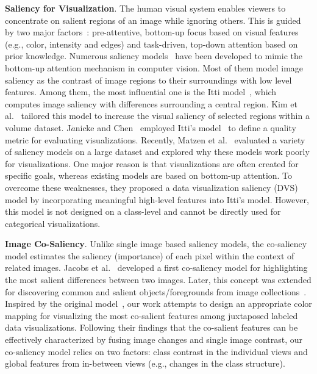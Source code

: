 \vspace{1.5mm}
\noindent\textbf{Saliency for Visualization}.
The human visual system enables viewers to concentrate on salient regions of an image while ignoring others. This is guided by two major factors~\cite{connor2004visual}: pre-attentive, bottom-up focus based on visual features (e.g., color, intensity and edges) and task-driven, top-down attention based on prior knowledge. %
Numerous saliency models~\cite{borji2019salient} have been developed to mimic the bottom-up attention mechanism in computer vision.
Most of them model image saliency as the contrast of image regions to their surroundings with low level features. Among them, the most influential one is the Itti model~\cite{Itti98}, which computes image saliency with
differences surrounding a central region.
Kim et al.~\cite{Kim06} tailored this model to increase the visual saliency of selected regions within a volume dataset.
J$\ddot{a}$nicke and Chen~\cite{Janicke10} employed Itti's model~\cite{Itti98} to define a quality metric for evaluating visualizations.
Recently, Matzen et al.~\cite{Matzen18} evaluated a variety of saliency models on a large dataset and explored why these models work poorly for visualizations. One major reason is that visualizations are often created for specific goals, whereas existing models are based on  bottom-up attention. To overcome these weaknesses, they proposed a data visualization saliency (DVS) model by incorporating meaningful high-level features into Itti's model. However, this model is not designed on a class-level and cannot be directly used for categorical visualizations.

\vspace{1.5mm}
\noindent\textbf{Image Co-Saliency}.
Unlike single image based saliency models, the co-saliency model estimates the saliency (importance) of each pixel within the context of related images. Jacobs et al.~\cite{Jacobs10} developed a first co-saliency model for highlighting the most salient differences between two  images.  Later, this concept was extended for discovering common and salient objects/foregrounds from image collections~\cite{zhang2018review}. Inspired by the original model~\cite{Jacobs10}, our work attempts to design an appropriate color mapping for visualizing the most co-salient features among juxtaposed labeled data visualizations. Following their findings that the co-salient features can be effectively characterized by fusing image changes and single image contrast, our co-saliency model relies on two factors: class contrast in the individual views  and global features from in-between views (e.g., changes in the class structure).
